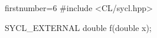 \begin{ccode*}{firstnumber=6}
#include <CL/sycl.hpp>

SYCL_EXTERNAL double f(double x);
\end{ccode*}

